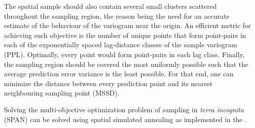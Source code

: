 The spatial sample should also contain several small clusters scattered throughout the sampling region, the 
reason being the need for an accurate estimate of the behaviour of the variogram near the origin. An efficient 
metric for achieving such objective is the number of unique points that form point-pairs in each of the 
exponentially spaced lag-distance classes of the sample variogram (PPL). Optimally, every point would form 
point-pairs in each lag class. Finally, the sampling region should be covered the most uniformly possible such 
that the average prediction error variance is the least possible. For that end, one can minimize the distance 
between every prediction point and its nearest neighbouring sampling point (MSSD).

Solving the multi-objective optimization problem of sampling in \emph{terra incognita} (SPAN) can be solved 
using spatial simulated annealing as implemented in the .

% 

